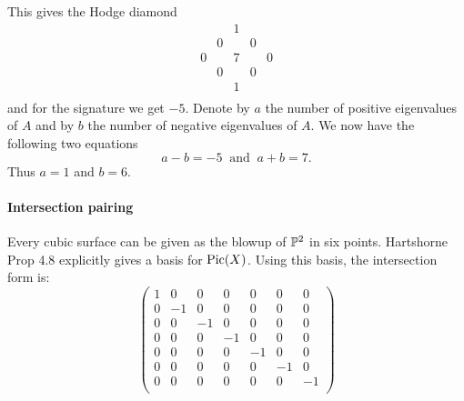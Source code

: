 This gives the Hodge diamond
\[
\begin{array}{ccccc}
&&1&&\\
& 0 && 0 & \\
0 && 7 && 0\\
& 0 && 0 & \\
&&1&&\\
\end{array}
\]
and for the signature we get $-5$. Denote by $a$ the number of positive eigenvalues of $A$ and by $b$ the number of negative eigenvalues of $A$. We now have the following two equations
\[
a-b = -5\ \mbox{ and }\ a+b = 7.
\]
Thus $a=1$ and $b=6$.

\paragraph*{Intersection pairing}
Every cubic surface can be given as the blowup of $\P^2$ in six points. Hartshorne Prop 4.8 explicitly gives a basis for $\Pic(X)$. Using this basis, the intersection form is:
\[
\left(
\begin{array}{ccccccc}
1 & 0 & 0 & 0 & 0 & 0 & 0 \\
0 & -1 & 0 & 0 & 0 & 0 & 0 \\
0 & 0 & -1 & 0 & 0 & 0 & 0 \\
0 & 0 & 0 & -1 & 0 & 0 & 0 \\
0 & 0 & 0 & 0 & -1 & 0 & 0 \\
0 & 0 & 0 & 0 & 0 & -1 & 0 \\
0 & 0 & 0 & 0 & 0 & 0 & -1 \\
\end{array}
\right)
\]
